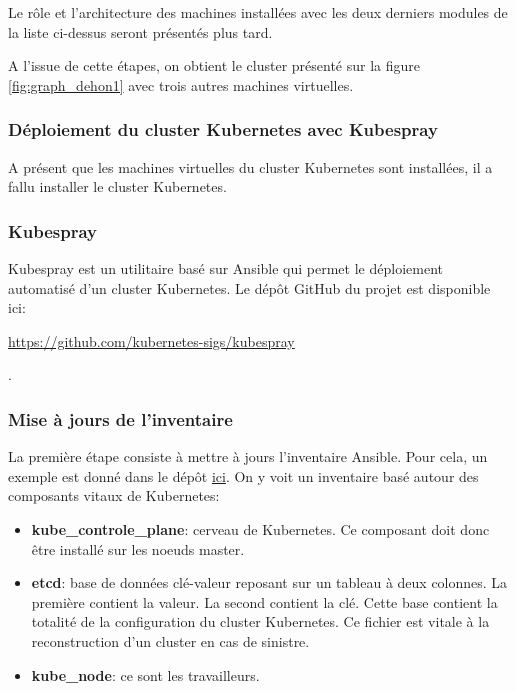 \documentclass[12pt, a4paper, twoside]{article}
\begin{document}
Le rôle et l'architecture des machines installées avec les deux derniers modules de la liste ci-dessus seront présentés plus tard.

A l'issue de cette étapes, on obtient le \gls{cluster} présenté sur la figure \ref{fig:graph_dehon1} avec trois autres machines virtuelles.

\subsubsection{Déploiement du cluster Kubernetes avec Kubespray}
A présent que les machines virtuelles du \gls{cluster} \gls{Kubernetes} sont installées, il a fallu installer le \gls{cluster} \gls{Kubernetes}.

\subsubsection{Kubespray}
\gls{Kubespray} est un utilitaire basé sur \gls{Ansible} qui permet le déploiement automatisé d'un \gls{cluster} \gls{Kubernetes}.
Le dépôt GitHub du projet est disponible ici: \\ \begin{hilite}\url{https://github.com/kubernetes-sigs/kubespray}\end{hilite}.

\subsubsection{Mise à jours de l'inventaire}
La première étape consiste à mettre à jours l'inventaire \gls{Ansible}.
Pour cela, un exemple est donné dans le dépôt \href{https://github.com/kubernetes-sigs/kubespray/blob/master/inventory/sample/inventory.ini}{ici}.
On y voit un inventaire basé autour des composants vitaux de \gls{Kubernetes}:
\begin{itemize}
    \item \textbf{kube\_controle\_plane}: cerveau de \gls{Kubernetes}.
    Ce composant doit donc être installé sur les noeuds master.
    \item \textbf{etcd}: base de données clé-valeur reposant sur un tableau à deux colonnes.
    La première contient la valeur.
    La second contient la clé.
    Cette base contient la totalité de la configuration du \gls{cluster} \gls{Kubernetes}.
    Ce fichier est vitale à la reconstruction d'un \gls{cluster} en cas de sinistre.
    \item \textbf{kube\_node}: ce sont les travailleurs.
\end{itemize}
\end{document}
